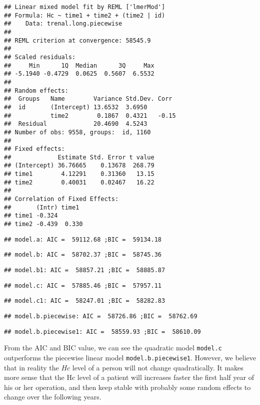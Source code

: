 \documentclass[
]{article}
\begin{document}
\begin{verbatim}
## Linear mixed model fit by REML ['lmerMod']
## Formula: Hc ~ time1 + time2 + (time2 | id)
##    Data: trenal.long.piecewise
## 
## REML criterion at convergence: 58545.9
## 
## Scaled residuals: 
##     Min      1Q  Median      3Q     Max 
## -5.1940 -0.4729  0.0625  0.5607  6.5532 
## 
## Random effects:
##  Groups   Name        Variance Std.Dev. Corr 
##  id       (Intercept) 13.6532  3.6950        
##           time2        0.1867  0.4321   -0.15
##  Residual             20.4690  4.5243        
## Number of obs: 9558, groups:  id, 1160
## 
## Fixed effects:
##             Estimate Std. Error t value
## (Intercept) 36.76665    0.13678  268.79
## time1        4.12291    0.31360   13.15
## time2        0.40031    0.02467   16.22
## 
## Correlation of Fixed Effects:
##       (Intr) time1 
## time1 -0.324       
## time2 -0.439  0.330
\end{verbatim}

\begin{verbatim}
## model.a: AIC =  59112.68 ;BIC =  59134.18
\end{verbatim}

\begin{verbatim}
## model.b: AIC =  58702.37 ;BIC =  58745.36
\end{verbatim}

\begin{verbatim}
## model.b1: AIC =  58857.21 ;BIC =  58885.87
\end{verbatim}

\begin{verbatim}
## model.c: AIC =  57885.46 ;BIC =  57957.11
\end{verbatim}

\begin{verbatim}
## model.c1: AIC =  58247.01 ;BIC =  58282.83
\end{verbatim}

\begin{verbatim}
## model.b.piecewise: AIC =  58726.86 ;BIC =  58762.69
\end{verbatim}

\begin{verbatim}
## model.b.piecewise1: AIC =  58559.93 ;BIC =  58610.09
\end{verbatim}

From the AIC and BIC value, we can see the quadratic model
\texttt{model.c} outperforms the piecewise linear model
\texttt{model.b.piecewise1}. However, we believe that in reality the
\(Hc\) level of a person will not change quadratically. It makes more
sense that the Hc level of a patient will increases faster the first
half year of his or her operation, and then keep stable with probably
some random effects to change over the following years.
\end{document}
